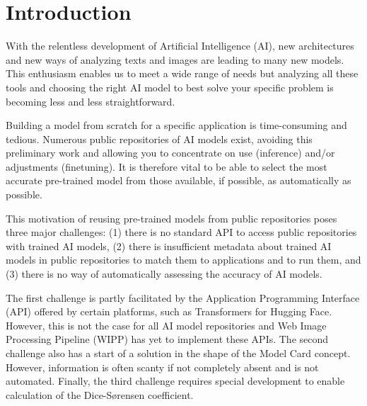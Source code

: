 \section{Introduction}
\label{sec:intro}

With the relentless development of Artificial Intelligence (AI), new
architectures and new ways of analyzing texts and images are leading to many new
models. This enthusiasm enables us to meet a wide range of needs but analyzing
all these tools and choosing the right AI model to best solve your specific
problem is becoming less and less straightforward.

Building a model from scratch for a specific application is time-consuming and
tedious. Numerous public repositories of AI models exist, avoiding this
preliminary work and allowing you to concentrate on use (inference) and/or
adjustments (finetuning). It is therefore vital to be able to select the most
accurate pre-trained model from those available, if possible, as automatically
as possible.

This motivation of reusing pre-trained models from public repositories poses
three major challenges: (1) there is no standard API to access public
repositories with trained AI models, (2) there is insufficient metadata about
trained AI models in public repositories to match them to applications and to
run them, and (3) there is no way of automatically assessing the accuracy of AI
models.

The first challenge is partly facilitated by the Application Programming
Interface (API) offered by certain platforms, such as Transformers for Hugging
Face. However, this is not the case for all AI model repositories and Web Image
Processing Pipeline (WIPP) has yet to implement these APIs. The second challenge
also has a start of a solution in the shape of the Model Card concept. However,
information is often scanty if not completely absent and is not automated.
Finally, the third challenge requires special development to enable calculation
of the Dice-Sørensen coefficient.
